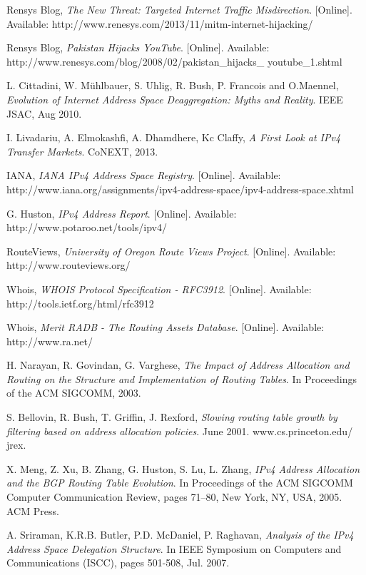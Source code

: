 \documentclass[11pt,a4paper]{scrreprt}
\begin{document}
\begin{thebibliography}{count}

    Rensys Blog,
    \emph{The New Threat: Targeted Internet Traffic Misdirection}.
    [Online]. Available: http://www.renesys.com/2013/11/mitm-internet-hijacking/


    Rensys Blog,
    \emph{Pakistan Hijacks YouTube}.
    [Online]. Available: http://www.renesys.com/blog/2008/02/pakistan\_hijacks\_
youtube\_1.shtml

	L. Cittadini, W. Mühlbauer, S. Uhlig, R. Bush, P. Francois and O.Maennel,
	\emph{Evolution of Internet Address Space Deaggregation: Myths and Reality}.
	IEEE JSAC, Aug 2010.
	
	I. Livadariu, A. Elmokashfi, A. Dhamdhere, Kc Claffy,
	\emph{A First Look at IPv4 Transfer Markets}.
	CoNEXT, 2013.
	
	IANA,
	\emph{IANA IPv4 Address Space Registry}.
	[Online]. Available: http://www.iana.org/assignments/ipv4-address-space/ipv4-address-space.xhtml
	
	G. Huston,
	\emph{IPv4 Address Report}.
	[Online]. Available: http://www.potaroo.net/tools/ipv4/

	RouteViews,
	\emph{University of Oregon Route Views Project}.
	[Online]. Available: http://www.routeviews.org/
	
	Whois,
	\emph{WHOIS Protocol Specification - RFC3912}.
	[Online]. Available: http://tools.ietf.org/html/rfc3912

	Whois,
	\emph{Merit RADB - The Routing Assets Database}.
	[Online]. Available: http://www.ra.net/

	H. Narayan, R. Govindan, G. Varghese,
	\emph{The Impact of Address Allocation and Routing on the Structure and Implementation of Routing Tables}.
	In Proceedings of the ACM SIGCOMM, 2003.
	
	S. Bellovin, R. Bush, T. Griffin, J. Rexford,
	\emph{Slowing routing table growth by filtering based on address allocation policies}.
	June 2001. www.cs.princeton.edu/ jrex.

	X. Meng, Z. Xu, B. Zhang, G. Huston, S. Lu, L. Zhang,
	\emph{IPv4 Address Allocation and the BGP Routing Table Evolution}.
	In Proceedings of the ACM SIGCOMM Computer Communication Review, pages 71–80, New York, NY, USA, 2005. ACM Press.

	A. Sriraman, K.R.B. Butler, P.D. McDaniel, P. Raghavan,
	\emph{Analysis of the IPv4 Address Space Delegation Structure}.
	In IEEE Symposium on Computers and Communications (ISCC), pages 501-508, Jul. 2007.
	
\end{thebibliography}	
\end{document}
